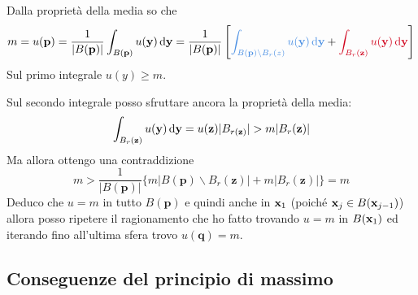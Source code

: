 \begin{dimostrazione}
\begin{figure}[H]
\begin{tikzpicture}[x=0.75pt,y=0.75pt,yscale=-1,xscale=1]
        \end{tikzpicture}
    \end{figure}
    \FloatBarrier

    Dalla proprietà della media so che
    \begin{equation*}
        m=u(\mathbf{p}) =\frac{1}{| B(\mathbf{p})| }\int _{B(\mathbf{p})} u(\y) \dyy=\frac{1}{| B(\mathbf{p})| }\left[\textcolor[rgb]{0.29,0.56,0.89}{\int _{B(\mathbf{p}) \backslash B_{r}(z)} u(\y) \dyy} +\textcolor[rgb]{0.82,0.01,0.11}{\int _{B_{r}(\mathbf{z})} u(\y) \dyy}\right]
    \end{equation*}
    Sul primo integrale $u(y) \geqslant m$.

    Sul secondo integrale posso sfruttare ancora la proprietà della media:
    \begin{equation*}
        \int _{B_{r}(\mathbf{z})} u(\y) \dyy=u(\mathbf{z})| B_{r(\mathbf{z})}|  >m| B_{r}(\mathbf{z})|
    \end{equation*}
    Ma allora ottengo una contraddizione
    \begin{equation*}
        m >\frac{1}{| B(\mathbf{p})| }\{m| B(\mathbf{p}) \backslash B_{r}(\mathbf{z})| +m| B_{r}(\mathbf{z})| \} =m
    \end{equation*}
    Deduco che $u=m$ in tutto $B(\mathbf{p})$ e quindi anche in $\x_{1}$ (poiché $\x_{j} \in B(\x_{j-1})$) allora posso ripetere il ragionamento che ho fatto trovando $u=m$ in $B(\x_{1})$ ed iterando fino all'ultima sfera trovo $u(\mathbf{q}) =m$.
\end{dimostrazione}
\subsection{Conseguenze del principio di massimo}

